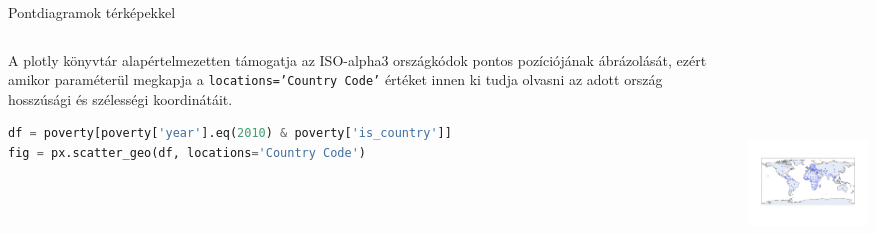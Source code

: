 \documentclass[english, aspectratio=169]{beamer}
\begin{document}
	\begin{frame}[fragile]{Pontdiagramok térképekkel}
		\begin{columns}
			\begin{column}{.5\textwidth}
				A plotly könyvtár alapértelmezetten támogatja az ISO-alpha3 országkódok pontos pozíciójának ábrázolását, ezért amikor paraméterül megkapja a \texttt{locations='Country Code'} értéket innen ki tudja olvasni az adott ország hosszúsági és szélességi koordinátáit.\par\smallskip
				\begin{lstlisting}[language=python]
df = poverty[poverty['year'].eq(2010) & poverty['is_country']]
fig = px.scatter_geo(df, locations='Country Code')				
				\end{lstlisting}
			\end{column}
			\begin{column}{.5\textwidth}
				\begin{center}
					\includegraphics[width=7cm, height=7cm, keepaspectratio]{images/scatter_29.png}
				\end{center}
			\end{column}
		\end{columns}
	\end{frame}
	
\end{document}
